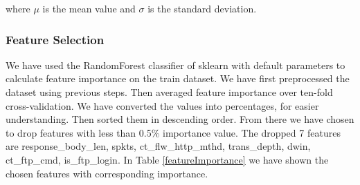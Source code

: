 \documentclass[14pt, conference]{IEEEtran}
\begin{document}
where $\mu$ is the mean value and $\sigma$ is the standard deviation.

\subsubsection{Feature Selection}
We have used the RandomForest classifier of sklearn with default parameters to calculate feature importance on the
train dataset. We have first preprocessed the dataset using previous steps. Then averaged feature importance over ten-fold
cross-validation. We have converted the values into percentages, for easier understanding. Then sorted them in descending order.
From there we have chosen to drop features with less than 0.5\% importance value. The dropped 7 features are response\_body\_len,
spkts, ct\_flw\_http\_mthd, trans\_depth, dwin, ct\_ftp\_cmd, is\_ftp\_login. In Table \ref{featureImportance} we have shown the chosen features with corresponding importance.
\end{document}
